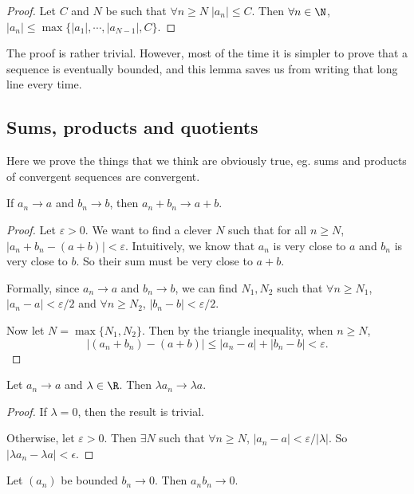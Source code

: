 \documentclass[a4paper]{article}
\begin{document}
\begin{proof}
  Let $C$ and $N$ be such that $\forall n\geq N\; |a_n| \leq C$. Then $\forall n \in \N$, $|a_n| \leq \max\{|a_1|, \cdots, |a_{N - 1}|, C\}$.
\end{proof}

The proof is rather trivial. However, most of the time it is simpler to prove that a sequence is eventually bounded, and this lemma saves us from writing that long line every time.

\subsection{Sums, products and quotients}
Here we prove the things that we think are obviously true, eg. sums and products of convergent sequences are convergent.

\begin{lemma}
  If $a_n \to a$ and $b_n \to b$, then $a_n + b_n \to a + b$.
\end{lemma}

\begin{proof}
  Let $\varepsilon > 0$. We want to find a clever $N$ such that for all $n \geq N$, $|a_n + b_n - (a+b)| < \varepsilon$. Intuitively, we know that $a_n$ is very close to $a$ and $b_n$ is very close to $b$. So their sum must be very close to $a + b$.

  Formally, since $a_n\to a$ and $b_n \to b$, we can find $N_1, N_2$ such that $\forall n \geq N_1$, $|a_n - a| < \varepsilon/2$ and $\forall n \geq N_2$, $|b_n - b| < \varepsilon/2$.

  Now let $N = \max\{N_1, N_2\}$. Then by the triangle inequality, when $n \geq N$,
  \[
    |(a_n + b_n) - (a + b)| \leq |a_n - a| + |b_n - b| < \varepsilon.
  \]
\end{proof}

\begin{lemma}
  Let $a_n \to a$ and $\lambda \in \R$. Then $\lambda a_n \to \lambda a$.
\end{lemma}

\begin{proof}
  If $\lambda = 0$, then the result is trivial.

  Otherwise, let $\varepsilon > 0$. Then $\exists N$ such that $\forall n \geq N$, $|a_n - a| < \varepsilon/|\lambda|$. So $|\lambda a_n - \lambda a| < \epsilon$.
\end{proof}

\begin{lemma}
  Let $(a_n)$ be bounded $b_n \to 0$. Then $a_nb_n \to 0$.
\end{lemma}
\end{document}
